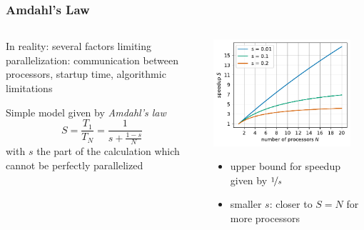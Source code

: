 \documentclass[aspectratio=169]{beamer}
\begin{document}
\begin{frame}
	\frametitle{Amdahl's Law}
	
	\begin{columns}
		\begin{column}{0.48\textwidth}
			In reality: several factors limiting parallelization: communication between processors, startup time, algorithmic limitations

			\vspace{10pt}

			Simple model given by \emph{Amdahl's law}
			\begin{equation}
				S = \frac{T_1}{T_N} = \frac{1}{s + \frac{1 - s}{N}}
			\end{equation}
			with \(s\) the part of the calculation which cannot be perfectly parallelized
		\end{column}

		\begin{column}{0.48\textwidth}
			\includegraphics[width=0.9\textwidth]{figs/amdahl.pdf}
			\begin{itemize}
				\item upper bound for speedup given by \(\nicefrac{1}{s}\)
				\item smaller \(s\): closer to \(S = N\) for more processors
			\end{itemize}
			
		\end{column}
	\end{columns}
\end{frame}
\end{document}
